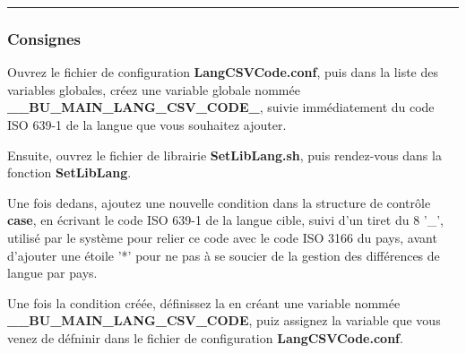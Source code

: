 \documentclass[a4paper,10pt]{article}
\begin{document}

\color{sec3}\par\noindent\rule{\textwidth}{0.4pt}\color{text}

\color{sec3}
\subsubsection{Consignes}\color{text}

\begin{justify}
    Ouvrez le fichier de configuration \textbf{\color{path}LangCSVCode.conf}, puis dans la liste des variables globales, créez une variable globale nommée \textbf{\color{vars}\_\_BU\_MAIN\_LANG\_CSV\_CODE\_}, suivie immédiatement du code ISO 639-1 de la langue que vous souhaitez ajouter.
\end{justify}

\begin{justify}
    Ensuite, ouvrez le fichier de librairie \textbf{\color{path}SetLibLang.sh}, puis rendez-vous dans la fonction \textbf{\color{mauve}SetLibLang}.
\end{justify}

\begin{justify}
    Une fois dedans, ajoutez une nouvelle condition dans la structure de contrôle \textbf{case}, en écrivant le code ISO 639-1 de la langue cible, suivi d'un tiret du 8 '\_', utilisé par le système pour relier ce code avec le code ISO 3166 du pays, avant d'ajouter une étoile '*' pour ne pas à se soucier de la gestion des différences de langue par pays.
\end{justify}

\begin{justify}
    Une fois la condition créée, définissez la en créant une variable nommée \textbf{\color{vars}\_\_BU\_MAIN\_LANG\_CSV\_CODE}, puiz assignez la variable que vous venez de défninir dans le fichier de configuration \textbf{\color{path}LangCSVCode.conf}.
\end{justify}
\end{document}
